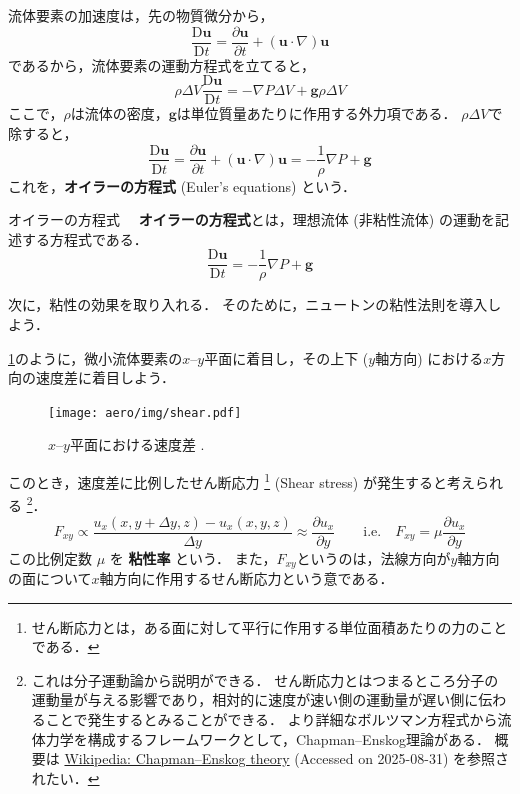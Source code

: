 \documentclass[uplatex,dvipdfmx,a4j,11pt]{jsreport}
\newcommand{\keyword}[1]{\textcolor{mainblue}{\textbf{#1}}}
\newcommand{\Diff}{\mathrm{D}} %
\numberwithin{equation}{chapter}
\begin{document}
流体要素の加速度は，先の物質微分から，
\begin{equation*}
  \frac{\Diff \mathbf{u}}{\Diff t} = \frac{\partial \mathbf{u}}{\partial t} + (\mathbf{u}\cdot \nabla)\mathbf{u}
\end{equation*}
であるから，流体要素の運動方程式を立てると，
\begin{equation}
  \rho \Delta V \frac{\Diff \mathbf{u}}{\Diff t} = -\nabla P \Delta V + \mathbf{g} \rho \Delta V
  \label{eq:euler_intermediate}
\end{equation}
ここで，$\rho$は流体の密度，$\mathbf{g}$は単位質量あたりに作用する外力項である．
$\rho \Delta V$で除すると，
\begin{equation}
  \frac{\Diff \mathbf{u}}{\Diff t} = \frac{\partial \mathbf{u}}{\partial t} + (\mathbf{u}\cdot \nabla)\mathbf{u} = -\frac{1}{\rho} \nabla P + \mathbf{g}
\end{equation}
これを，\keyword{オイラーの方程式} (Euler's equations) という．

\begin{definition}{オイラーの方程式}{}{}
    　\keyword{オイラーの方程式}とは，理想流体 (非粘性流体) の運動を記述する方程式である．
   \begin{equation}
     \frac{\Diff \mathbf{u}}{\Diff t} = -\frac{1}{\rho} \nabla P + \mathbf{g}
     \label{eq:euler_equation}
   \end{equation}
\end{definition}

\enskip

次に，粘性の効果を取り入れる．
そのために，ニュートンの粘性法則を導入しよう．

\cref{fig:shear}のように，微小流体要素の$x$--$y$平面に着目し，その上下 ($y$軸方向) における$x$方向の速度差に着目しよう．
\begin{figure}[H]
  \centering
  \texttt{[image: aero/img/shear.pdf]}
  \caption{$x$--$y$平面における速度差 .}
  \label{fig:shear}
\end{figure}
このとき，速度差に比例したせん断応力
\footnote{せん断応力とは，ある面に対して平行に作用する単位面積あたりの力のことである．}
 (Shear stress) が発生すると考えられる
\footnote{
  これは分子運動論から説明ができる．
  せん断応力とはつまるところ分子の運動量が与える影響であり，相対的に速度が速い側の運動量が遅い側に伝わることで発生するとみることができる．
  より詳細なボルツマン方程式から流体力学を構成するフレームワークとして，Chapman--Enskog理論がある．
  概要は \href{https://en.wikipedia.org/wiki/Chapman\%e2\%80\%93Enskog_theory}{Wikipedia: Chapman--Enskog theory} (Accessed on 2025-08-31) を参照されたい．
}．
\begin{equation*}
  F_{xy} \propto \frac{u_x(x, y + \Delta y, z) - u_x(x, y, z)}{\Delta y} \approx \frac{\partial u_x}{\partial y}\qquad
  \text{i.e.}\quad  F_{xy} = \mu \frac{\partial u_x}{\partial y}
\end{equation*}
この比例定数 $\mu$ を \keyword{粘性率} という．
また，$F_{xy}$というのは，法線方向が$y$軸方向の面について$x$軸方向に作用するせん断応力という意である．
\end{document}
